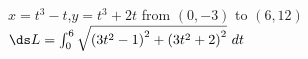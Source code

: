 {$x=t^3-t$,\quad  $y=t^3+2t$ from $(0,-3)$ to $(6,12)$}
{$\ds L=\int_0^6 \sqrt{\left(3t^2-1\right)^2+\left(3t^2+2\right)^2}\ dt$ }
